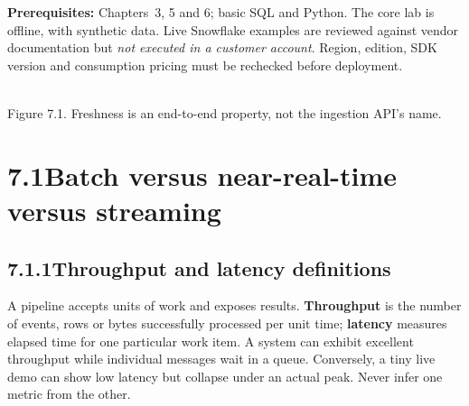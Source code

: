 \documentclass[11pt,twoside]{article}
\newcommand{\topic}[2]{\subsection*{#1\quad #2}}
\begin{document}
\textbf{Prerequisites:} Chapters~3, 5 and 6; basic SQL and Python. The core lab is offline, with synthetic data. Live Snowflake examples are reviewed against vendor documentation but \emph{not executed in a customer account}. Region, edition, SDK version and consumption pricing must be rechecked before deployment.
\begin{center}\\{\fontsize{8}{9}\selectfont\color{inkgray}Figure 7.1. Freshness is an end-to-end property, not the ingestion API's name.}\end{center}
\newpage
\section*{7.1\quad Batch versus near-real-time versus streaming}
\topic{7.1.1}{Throughput and latency definitions}
A pipeline accepts units of work and exposes results. \textbf{Throughput} is the number of events, rows or bytes successfully processed per unit time; \textbf{latency} measures elapsed time for one particular work item. A system can exhibit excellent throughput while individual messages wait in a queue. Conversely, a tiny live demo can show low latency but collapse under an actual peak. Never infer one metric from the other.
\end{document}
